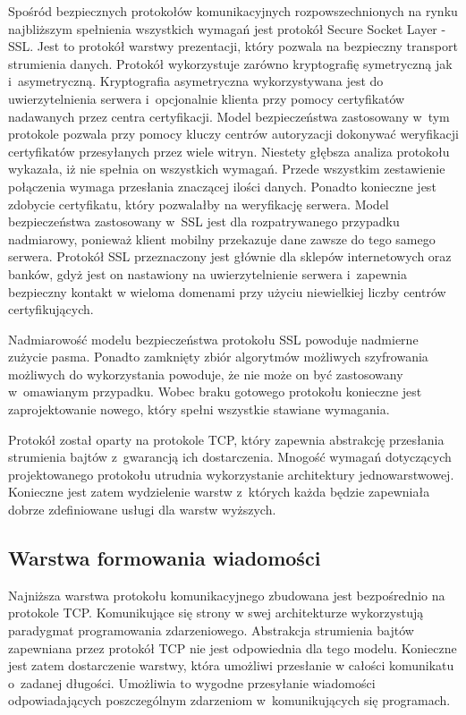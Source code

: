 Spośród bezpiecznych protokołów komunikacyjnych rozpowszechnionych na
rynku najbliższym spełnienia wszystkich wymagań jest protokół Secure
Socket Layer - SSL. Jest to protokół warstwy prezentacji, który
pozwala na bezpieczny transport strumienia danych. Protokół
wykorzystuje zarówno kryptografię symetryczną jak
i~asymetryczną. Kryptografia asymetryczna wykorzystywana jest do
uwierzytelnienia serwera i~opcjonalnie klienta przy pomocy
certyfikatów nadawanych przez centra certyfikacji. Model
bezpieczeństwa zastosowany w~tym protokole pozwala przy pomocy kluczy
centrów autoryzacji dokonywać weryfikacji certyfikatów przesyłanych
przez wiele witryn. Niestety głębsza analiza protokołu wykazała, iż
nie spełnia on wszystkich wymagań. Przede wszystkim zestawienie
połączenia wymaga przesłania znaczącej ilości danych. Ponadto
konieczne jest zdobycie certyfikatu, który pozwalałby na weryfikację
serwera. Model bezpieczeństwa zastosowany w~SSL jest dla
rozpatrywanego przypadku nadmiarowy, ponieważ klient mobilny
przekazuje dane zawsze do tego samego serwera. Protokół SSL
przeznaczony jest głównie dla sklepów internetowych oraz banków, gdyż
jest on nastawiony na uwierzytelnienie serwera i~zapewnia bezpieczny
kontakt w wieloma domenami przy użyciu niewielkiej liczby centrów
certyfikujących.

Nadmiarowość modelu bezpieczeństwa protokołu SSL powoduje nadmierne
zużycie pasma. Ponadto zamknięty zbiór algorytmów możliwych
szyfrowania możliwych do wykorzystania powoduje, że nie może on być
zastosowany w~omawianym przypadku. Wobec braku gotowego protokołu
konieczne jest zaprojektowanie nowego, który spełni wszystkie stawiane
wymagania.

Protokół został oparty na protokole TCP, który zapewnia abstrakcję
przesłania strumienia bajtów z~gwarancją ich dostarczenia. Mnogość
wymagań dotyczących projektowanego protokołu utrudnia wykorzystanie
architektury jednowarstwowej. Konieczne jest zatem wydzielenie warstw
z~których każda będzie zapewniała dobrze zdefiniowane usługi dla
warstw wyższych.
 

\subsection[Warstwa formowania wiadomości][Warstwa formowania wiadomości]{Warstwa formowania wiadomości}

Najniższa warstwa protokołu komunikacyjnego zbudowana jest
bezpośrednio na protokole TCP. Komunikujące się strony w swej
architekturze wykorzystują paradygmat programowania
zdarzeniowego. Abstrakcja strumienia bajtów zapewniana przez protokół
TCP nie jest odpowiednia dla tego modelu. Konieczne jest zatem
dostarczenie warstwy, która umożliwi przesłanie w całości komunikatu
o~zadanej długości. Umożliwia to wygodne przesyłanie wiadomości
odpowiadających poszczególnym zdarzeniom w~komunikujących się
programach.

